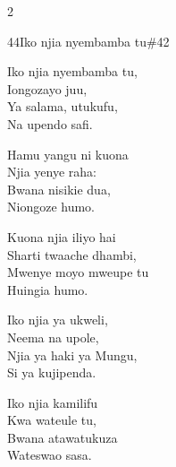 \begin{multicols}{2}
\begin{hymn}{44}{Iko njia nyembamba tu}{\#42}
\begin{stanza}
Iko njia nyembamba tu,\\
Iongozayo juu,\\
Ya salama, utukufu,\\
Na upendo safi.
\end{stanza}
\begin{chorus}
Hamu yangu ni kuona\\
Njia yenye raha:\\
Bwana nisikie dua,\\
Niongoze humo.
\end{chorus}
\begin{stanza}
Kuona njia iliyo hai\\
Sharti twaache dhambi,\\
Mwenye moyo mweupe tu\\
Huingia humo.
\end{stanza}
\begin{stanza}
Iko njia ya ukweli,\\
Neema na upole,\\
Njia ya haki ya Mungu,\\
Si ya kujipenda.
\end{stanza}
\begin{stanza}
Iko njia kamilifu\\
Kwa wateule tu,\\
Bwana atawatukuza\\
Wateswao sasa.
\end{stanza}
\end{hymn}


\end{multicols}
